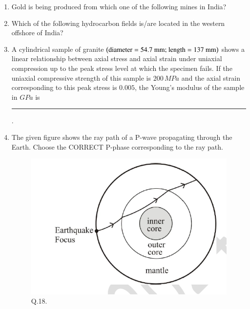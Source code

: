 \documentclass[journal,12pt,onecolumn]{IEEEtran}
\theoremstyle{remark}
\begin{document}
\begin{enumerate}
\item Gold is being produced from which one of the following mines in India?
\begin{enumerate}
\end{enumerate}
\hfill{}

\item Which of the following hydrocarbon fields is/are located in the western offshore of India?
\begin{enumerate}
\end{enumerate}
\hfill{}

\item A cylindrical sample of granite $\left(\text{diameter} = 54.7 \text{ mm; length} = 137 \text{ mm}\right)$ shows a linear relationship between axial stress and axial strain under uniaxial compression up to the peak stress level at which the specimen fails. If the uniaxial compressive strength of this sample is $200\,MPa$ and the axial strain corresponding to this peak stress is $0.005$, the Young's modulus of the sample in $GPa$ is \rule{3cm}{0.15mm} .
\hfill{}

\item The given figure shows the ray path of a P-wave propagating through the Earth. Choose the CORRECT P-phase corresponding to the ray path.
\begin{figure}[H]
    \centering
    \includegraphics[width=0.4\columnwidth]{Figs/fig_4.png}
    \caption{Q.18.}
    \label{fig:q18}
\end{figure}
\begin{enumerate}
\end{enumerate}
\hfill{}


\end{enumerate}
\end{document}

